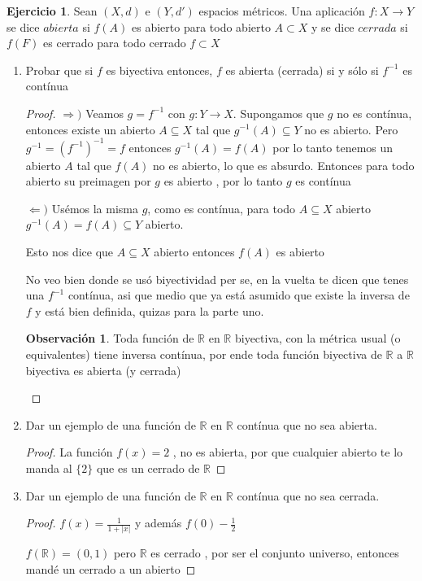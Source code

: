 \documentclass[11pt]{report}
\newcommand{\R}{\mathbb{R}}
\newcommand{\Ra}{\Rightarrow}
\newcommand{\ra}{\rightarrow}
\theoremstyle{definition}
\newtheorem*{remark}{Observación}
\newtheorem{ej}{Ejercicio}
\begin{document}
	\begin{ej}
		Sean $(X,d)$ e $(Y,d')$ espacios métricos. Una aplicación $f: X \ra Y$ se dice $abierta$ si $f(A)$ es abierto para todo abierto $A \subset X$ y se dice $cerrada$ si $f(F)$ es cerrado para todo cerrado $f \subset X$
		\begin{enumerate}
			\item Probar que si $f$ es biyectiva entonces, $f$ es abierta (cerrada) si y sólo si $f^{-1}$ es contínua
				\begin{proof}
					$\Ra )$ Veamos $g = f^{-1}$ con $g : Y \ra X$. Supongamos que $g$ no es contínua, entonces existe un abierto $A \subseteq X$ tal que $g^{-1}(A) \subseteq Y$ no es abierto.
					Pero $g^{-1} = (f^{-1})^{-1} = f$ entonces $g^{-1}(A) = f(A)$ por lo tanto tenemos un abierto $A$ tal que $f(A)$ no es abierto, lo que es absurdo. Entonces para todo abierto su preimagen por $g$ es abierto , por lo tanto $g$ es contínua

					$\Leftarrow )$ Usémos la misma $g$, como es contínua, para todo $A \subseteq X$ abierto $g^{-1}(A) = f(A)\subseteq Y$ abierto.

					Esto nos dice que $A \subseteq X$ abierto entonces $f(A)$ es abierto

					No veo bien donde se usó biyectividad per se, en la vuelta te dicen que tenes una $f^{-1}$ contínua, asi que medio que ya está asumido que existe la inversa de $f$ y está bien definida, quizas para la parte uno.

					\begin{remark}
						Toda función de $\R$ en $\R$ biyectiva, con la métrica usual (o equivalentes) tiene inversa contínua, por ende toda función biyectiva de $\R$ a $\R$ biyectiva es abierta (y cerrada)
					\end{remark}
				\end{proof}
			\item Dar un ejemplo de una función de $\R$ en $\R$ contínua que no sea abierta. 
				\begin{proof}
					La función $f(x) = 2$ , no es abierta, por que cualquier abierto te lo manda al $\{2\}$ que es un cerrado de $\R$
				\end{proof}

			\item Dar un ejemplo de una función de $\R$ en $\R$ contínua que no sea cerrada.
				\begin{proof}
					$f(x) = \frac{1}{1+|x|}$ y además $f(0) - \frac{1}{2}$

					$f(\R) = (0,1)$ pero $\R$ es cerrado , por ser el conjunto universo, entonces mandé un cerrado a un abierto 
				\end{proof}
		

\end{enumerate}
\end{ej}
\end{document}
